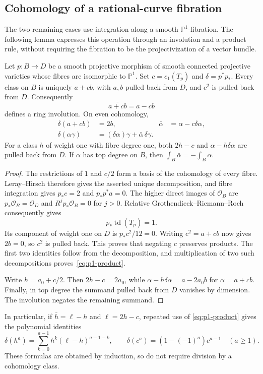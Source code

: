 \subsection{Cohomology of a rational-curve fibration}
\label{subsec:p1-cohomology}

The two remaining cases use integration along a smooth
$\mathbb P^1$-fibration. The following lemma expresses this operation
through an involution and a product rule, without requiring the
fibration to be the projectivization of a vector bundle.

\begin{lemma}\label{lem:p1-involution}
Let $p:B\to D$ be a smooth projective morphism of smooth connected
projective varieties whose fibres are isomorphic to $\mathbb P^1$.
Set $c=c_1(T_p)$ and $\delta=p^*p_*$.
Every class on $B$ is uniquely $a+cb$, with $a,b$ pulled back from $D$,
and $c^2$ is pulled back from $D$. Consequently
\[
 \overline{a+cb}=a-cb
\]
defines a ring involution. On even cohomology,
\begin{align}
 \delta(a+cb)&=2b,&
 \bar\alpha&=\alpha-c\delta\alpha,\label{eq:p1-involution}\\
 \delta(\alpha\gamma)
   &=(\delta\alpha)\gamma+\bar\alpha\,\delta\gamma.
   \label{eq:p1-product}
\end{align}
For a class $h$ of weight one with fibre degree one, both $2h-c$ and
$\alpha-h\delta\alpha$ are pulled back from $D$.
If $\alpha$ has top degree on $B$, then
$\int_B\bar\alpha=-\int_B\alpha$.
\end{lemma}

\begin{proof}
The restrictions of $1$ and $c/2$ form a basis of the cohomology of every
fibre. Leray--Hirsch therefore gives the asserted unique decomposition,
and fibre integration gives $p_*c=2$ and $p_*p^*a=0$.
The higher direct images of $\mathcal O_B$ are $p_*\mathcal O_B=\mathcal
O_D$ and $R^jp_*\mathcal O_B=0$ for $j>0$. Relative
Grothendieck--Riemann--Roch~\cite{BorelSerre1958} consequently gives
\[
 p_*\operatorname{td}(T_p)=1.
\]
Its component of weight one on $D$ is $p_*c^2/12=0$.
Writing $c^2=a+cb$ now gives $2b=0$, so $c^2$ is pulled back. This proves
that negating $c$ preserves products. The first two identities follow
from the decomposition, and multiplication of two such decompositions
proves~\eqref{eq:p1-product}.

Write $h=a_0+c/2$. Then $2h-c=2a_0$, while
$\alpha-h\delta\alpha=a-2a_0b$ for $\alpha=a+cb$.
Finally, in top degree the summand pulled back from $D$ vanishes by
dimension. The involution negates the remaining summand.
\end{proof}

In particular, if $\bar h=\ell-h$ and $\ell=2h-c$, repeated use of
\eqref{eq:p1-product} gives the polynomial identities
\begin{equation}\label{eq:p1-powers}
 \delta(h^a)=\sum_{k=0}^{a-1}h^k(\ell-h)^{a-1-k},\qquad
 \delta(c^a)=(1-(-1)^a)c^{a-1}\quad(a\ge1).
\end{equation}
These formulas are obtained by induction, so do not require division
by a cohomology class.
